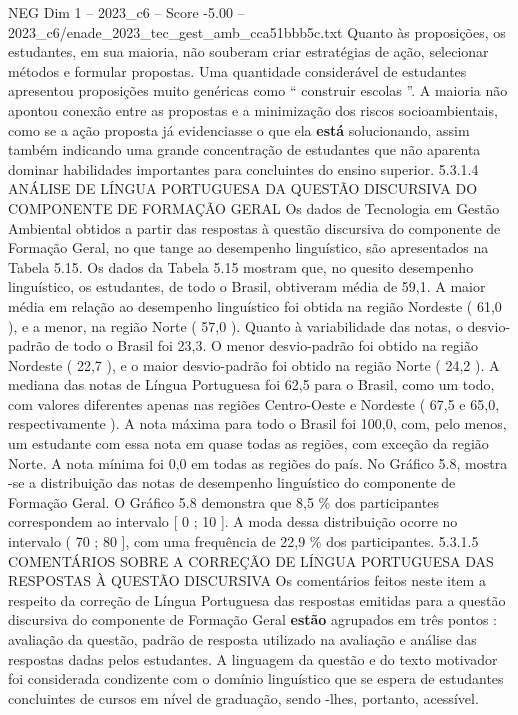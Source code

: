 \begin{textsample}{NEG Dim 1 – 2023\_c6 – Score -5.00 – 2023\_c6/enade\_2023\_tec\_gest\_amb\_cca51bbb5c.txt}
Quanto às proposições, os estudantes, em sua maioria, não souberam criar estratégias de ação, selecionar métodos e formular propostas.
Uma quantidade considerável de estudantes apresentou proposições muito genéricas como “ construir escolas ”.
A maioria não apontou conexão entre as propostas e a minimização dos riscos socioambientais, como se a ação proposta já evidenciasse o que ela \textbf{está} solucionando, assim também indicando uma grande concentração de estudantes que não aparenta dominar habilidades importantes para concluintes do ensino superior. 5.3.1.4 ANÁLISE DE LÍNGUA PORTUGUESA DA QUESTÃO DISCURSIVA DO COMPONENTE DE FORMAÇÃO GERAL Os dados de Tecnologia em Gestão Ambiental obtidos a partir das respostas à questão discursiva do componente de Formação Geral, no que tange ao desempenho linguístico, são apresentados na Tabela 5.15.
Os dados da Tabela 5.15 mostram que, no quesito desempenho linguístico, os estudantes, de todo o Brasil, obtiveram média de 59,1.
A maior média em relação ao desempenho linguístico foi obtida na região Nordeste ( 61,0 ), e a menor, na região Norte ( 57,0 ).
Quanto à variabilidade das notas, o desvio-padrão de todo o Brasil foi 23,3.
O menor desvio-padrão foi obtido na região Nordeste ( 22,7 ), e o maior desvio-padrão foi obtido na região Norte ( 24,2 ).
A mediana das notas de Língua Portuguesa foi 62,5 para o Brasil, como um todo, com valores diferentes apenas nas regiões Centro-Oeste e Nordeste ( 67,5 e 65,0, respectivamente ).
A nota máxima para todo o Brasil foi 100,0, com, pelo menos, um estudante com essa nota em quase todas as regiões, com exceção da região Norte.
A nota mínima foi 0,0 em todas as regiões do país.
No Gráfico 5.8, mostra -se a distribuição das notas de desempenho linguístico do componente de Formação Geral.
O Gráfico 5.8 demonstra que 8,5 \% dos participantes correspondem ao intervalo [ 0 ; 10 ].
A moda dessa distribuição ocorre no intervalo ( 70 ; 80 ], com uma frequência de 22,9 \% dos participantes. 5.3.1.5 COMENTÁRIOS SOBRE A CORREÇÃO DE LÍNGUA PORTUGUESA DAS RESPOSTAS À QUESTÃO DISCURSIVA Os comentários feitos neste item a respeito da correção de Língua Portuguesa das respostas emitidas para a questão discursiva do componente de Formação Geral \textbf{estão} agrupados em três pontos : avaliação da questão, padrão de resposta utilizado na avaliação e análise das respostas dadas pelos estudantes.
A linguagem da questão e do texto motivador foi considerada condizente com o domínio linguístico que se espera de estudantes concluintes de cursos em nível de graduação, sendo -lhes, portanto, acessível.

\end{textsample}
